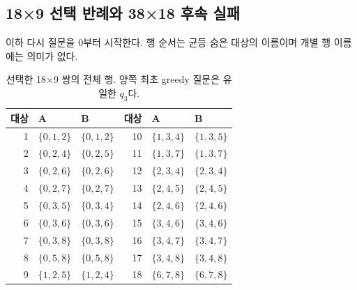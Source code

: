 \documentclass[11pt,a4paper]{article}
\theoremstyle{definition}
\theoremstyle{remark}\newtheorem{remark}[theorem]{주석}
\begin{document}
\subsection{18×9 선택 반례와 38×18 후속 실패}
이하 다시 질문을 0부터 시작한다. 행 순서는 균등 숨은 대상의 이름이며 개별 행 이름에는 의미가 없다.
\begin{table}[htbp]
\centering\small
\caption{선택한 18×9 쌍의 전체 행. 양쪽 최초 greedy 질문은 유일한 $q_3$다.}\label{tab:witness18}
\begin{tabular}{rllrll}\toprule
대상 & A & B & 대상 & A & B\\\midrule
1 & $\{0,1,2\}$ & $\{0,1,2\}$ & 10 & $\{1,3,4\}$ & $\{1,3,5\}$\\
2 & $\{0,2,4\}$ & $\{0,2,5\}$ & 11 & $\{1,3,7\}$ & $\{1,3,7\}$\\
3 & $\{0,2,6\}$ & $\{0,2,6\}$ & 12 & $\{2,3,4\}$ & $\{2,3,4\}$\\
4 & $\{0,2,7\}$ & $\{0,2,7\}$ & 13 & $\{2,4,5\}$ & $\{2,4,5\}$\\
5 & $\{0,3,5\}$ & $\{0,3,4\}$ & 14 & $\{2,4,6\}$ & $\{2,4,6\}$\\
6 & $\{0,3,6\}$ & $\{0,3,6\}$ & 15 & $\{3,4,6\}$ & $\{3,4,6\}$\\
7 & $\{0,3,8\}$ & $\{0,3,8\}$ & 16 & $\{3,4,7\}$ & $\{3,4,7\}$\\
8 & $\{0,5,8\}$ & $\{0,5,8\}$ & 17 & $\{3,4,8\}$ & $\{3,4,8\}$\\
9 & $\{1,2,5\}$ & $\{1,2,4\}$ & 18 & $\{6,7,8\}$ & $\{6,7,8\}$\\
\bottomrule\end{tabular}

\end{table}
\end{document}
